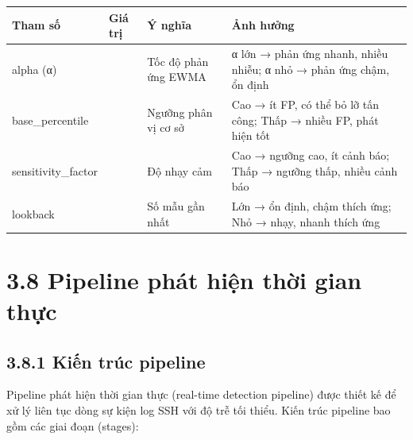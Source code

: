\documentclass[
  a4paper]{report}
\newcounter{none} %
\begin{document}
{\def\LTcaptype{none} %
\begin{longtable}[]{@{}
  >{\raggedright\arraybackslash}p{}
  >{\raggedright\arraybackslash}p{}
  >{\raggedright\arraybackslash}p{}
  >{\raggedright\arraybackslash}p{}@{}}
\toprule\noalign{}
\begin{minipage}[b]{\linewidth}\raggedright
Tham số
\end{minipage} & \begin{minipage}[b]{\linewidth}\raggedright
Giá trị
\end{minipage} & \begin{minipage}[b]{\linewidth}\raggedright
Ý nghĩa
\end{minipage} & \begin{minipage}[b]{\linewidth}\raggedright
Ảnh hưởng
\end{minipage} \\
\midrule\noalign{}
\endhead
\bottomrule\noalign{}
\endlastfoot
alpha (α) & 0.3 & Tốc độ phản ứng EWMA & α lớn → phản ứng nhanh, nhiều
nhiễu; α nhỏ → phản ứng chậm, ổn định \\
base\_percentile & 95 & Ngưỡng phân vị cơ sở & Cao → ít FP, có thể bỏ lỡ
tấn công; Thấp → nhiều FP, phát hiện tốt \\
sensitivity\_factor & 1.5 & Độ nhạy cảm & Cao → ngưỡng cao, ít cảnh báo;
Thấp → ngưỡng thấp, nhiều cảnh báo \\
lookback & 100 & Số mẫu gần nhất & Lớn → ổn định, chậm thích ứng; Nhỏ →
nhạy, nhanh thích ứng \\
\end{longtable}
}

\section{3.8 Pipeline phát hiện thời gian
thực}\label{pipeline-phuxe1t-hiux1ec7n-thux1eddi-gian-thux1ef1c}

\subsection{3.8.1 Kiến trúc pipeline}\label{kiux1ebfn-truxfac-pipeline}

Pipeline phát hiện thời gian thực (real-time detection pipeline) được
thiết kế để xử lý liên tục dòng sự kiện log SSH với độ trễ tối thiểu.
Kiến trúc pipeline bao gồm các giai đoạn (stages):
\end{document}
